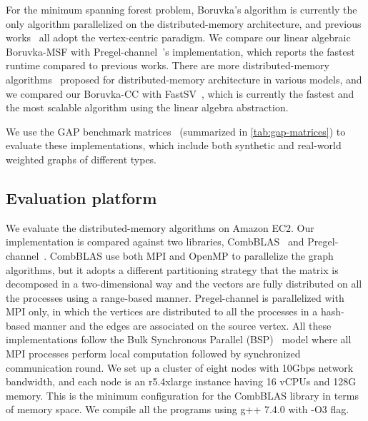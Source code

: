 \documentclass{sokendai_thesis} %
\newcommand{\boruvka}[0]{Boruvka}
\begin{document}
For the minimum spanning forest problem, \boruvka{}'s algorithm is currently the only algorithm parallelized on the distributed-memory architecture, and previous works~\cite{yan2014pregel,zhang2019composing} all adopt the vertex-centric paradigm.
We compare our linear algebraic \boruvka{}-MSF with Pregel-channel~\cite{zhang2019composing}'s implementation, which reports the fastest runtime compared to previous works.
There are more distributed-memory algorithms~\cite{hashmin,parconnect,lacc,fastsv} proposed for distributed-memory architecture in various models, and we compared our \boruvka{}-CC with FastSV~\cite{fastsv}, which is currently the fastest and the most scalable algorithm using the linear algebra abstraction.

We use the GAP benchmark matrices~\cite{gap-benchmark} (summarized in \autoref{tab:gap-matrices}) to evaluate these implementations, which include both synthetic and real-world weighted graphs of different types.

\subsection{Evaluation platform}

We evaluate the distributed-memory algorithms on Amazon EC2.
Our implementation is compared against two libraries, CombBLAS~\cite{combblas} and Pregel-channel~\cite{zhang2019composing}.
CombBLAS use both MPI and OpenMP to parallelize the graph algorithms, but it adopts a different partitioning strategy that the matrix is decomposed in a two-dimensional way and the vectors are fully distributed on all the processes using a range-based manner.
Pregel-channel is parallelized with MPI only, in which the vertices are distributed to all the processes in a hash-based manner and the edges are associated on the source vertex.
All these implementations follow the Bulk Synchronous Parallel (BSP)~\cite{bsp} model where all MPI processes perform local computation followed by synchronized communication round.
We set up a cluster of eight nodes with 10Gbps network bandwidth, and each node is an r5.4xlarge instance having 16 vCPUs and 128G memory.
This is the minimum configuration for the CombBLAS library in terms of memory space.
We compile all the programs using g++ 7.4.0 with -O3 flag.
\end{document}
